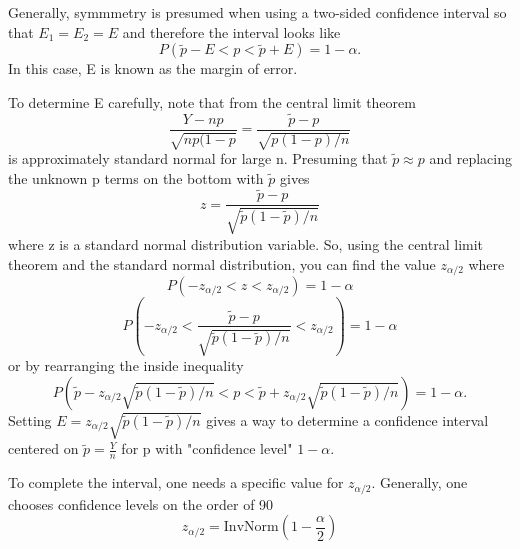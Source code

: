 \documentclass[10pt,]{book}
\numberwithin{equation}{section}
\newcommand{\lt}{<}
\begin{document}
%
\par
\hypertarget{p-1343}{}%
Generally, symmmetry is presumed when using a two-sided confidence interval so that \(E_1 = E_2 = E\) and therefore the interval looks like%
\begin{equation*}
P(\tilde{p} - E \lt p \lt \tilde{p} + E) = 1 - \alpha.
\end{equation*}
In this case, E is known as the margin of error.%
\par
\hypertarget{p-1344}{}%
To determine E carefully, note that from the central limit theorem%
\begin{equation*}
\frac{Y-np}{\sqrt{np(1-p}} = \frac{\tilde{p} - p}{\sqrt{p(1-p)/n}}
\end{equation*}
is approximately standard normal for large n.  Presuming that \(\tilde{p} \approx p\) and replacing the unknown p terms on the bottom with \(\tilde{p}\) gives%
\begin{equation*}
z = \frac{\tilde{p} - p}{\sqrt{\tilde{p}(1-\tilde{p})/n}}
\end{equation*}
where z is a standard normal distribution variable. So, using the central limit theorem and the standard normal distribution, you can find the value \(z_{ \alpha/2}\) where%
\begin{equation*}
P( -z_{ \alpha/2} \lt z \lt z_{ \alpha/2}) = 1 - \alpha
\end{equation*}
%
\begin{equation*}
P( -z_{ \alpha/2} \lt \frac{\tilde{p} - p}{\sqrt{\tilde{p}(1-\tilde{p})/n}} \lt z_{ \alpha/2}) = 1 - \alpha
\end{equation*}
or by rearranging the inside inequality%
\begin{equation*}
P( \tilde{p} - z_{ \alpha/2}\sqrt{\tilde{p}(1-\tilde{p})/n} \lt  p \lt \tilde{p} + z_{ \alpha/2}\sqrt{\tilde{p}(1-\tilde{p})/n}) = 1 - \alpha.
\end{equation*}
Setting \(E = z_{ \alpha/2}\sqrt{\tilde{p}(1-\tilde{p})/n}\) gives a way to determine a confidence interval centered on \(\tilde{p} = \frac{Y}{n}\) for p with "confidence level" \(1-\alpha\).%
\par
\hypertarget{p-1345}{}%
To complete the interval, one needs a specific value for \(z_{ \alpha/2}\). Generally, one chooses confidence levels on the order of 90%
\begin{equation*}
z_{\alpha /2} = \text{InvNorm}( 1 - \frac{\alpha}{2} )
\end{equation*}
\end{document}
